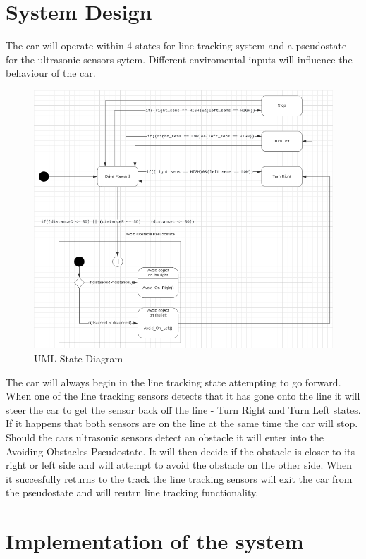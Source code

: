 \documentclass[conference]{IEEEtran}
\begin{document}
\section{System Design}
The car will operate within 4 states for line tracking system and a pseudostate for the ultrasonic sensors sytem. Different enviromental inputs will influence the behaviour of the car.
\begin{figure}[h!]
	\includegraphics[width=\linewidth]{UMLStateDiagram.png}
	\caption{UML State Diagram}
	\label{fig:UMLSM1}
\end{figure}

The car will always begin in the line tracking state attempting to go forward. When one of the line tracking sensors detects that it has gone onto the line it will steer the car to get the sensor back off the line - Turn Right and Turn Left states. If it happens that both sensors are on the line at the same time the car will stop. Should the cars ultrasonic sensors detect an obstacle it will enter into the Avoiding Obstacles Pseudostate. It will then decide if the obstacle is closer to its right or left side and will attempt to avoid the obstacle on the other side. When it succesfully returns to the track the line tracking sensors will exit the car from the pseudostate and will reutrn line tracking functionality.

\section{Implementation of the system}
\end{document}
